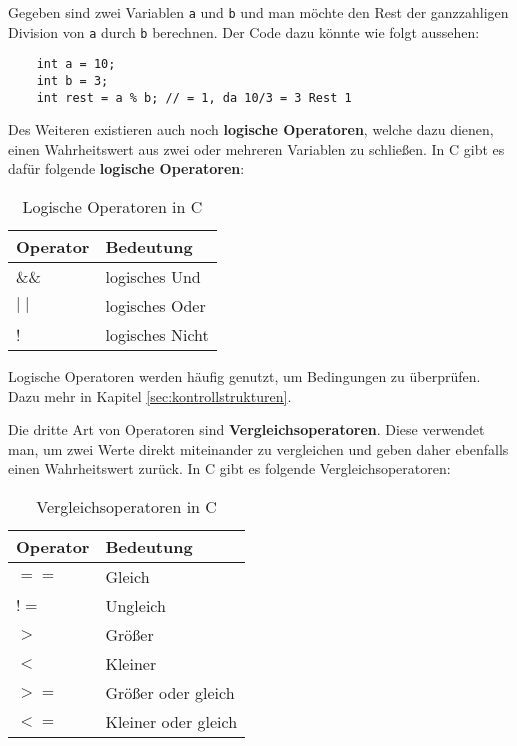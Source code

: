 \documentclass[11pt]{article}
\begin{document}
\begin{bsp}
  Gegeben sind zwei Variablen \texttt{a} und \texttt{b} und man möchte den Rest der ganzzahligen Division von \texttt{a}
  durch \texttt{b} berechnen. Der Code dazu könnte wie folgt aussehen:
  \begin{verbatim}
    int a = 10;
    int b = 3;
    int rest = a % b; // = 1, da 10/3 = 3 Rest 1
  \end{verbatim}

\end{bsp}

Des Weiteren existieren auch noch \textbf{logische Operatoren}, welche dazu dienen, einen Wahrheitswert aus zwei oder
mehreren Variablen zu schließen. In C gibt es dafür folgende \textbf{logische Operatoren}:
\begin{table}[h!]
  \centering
  \begin{tabular}{@{}ll@{}}
    \toprule
    Operator   & Bedeutung       \\ \midrule
    \&\&       & logisches Und   \\
    $\mid\mid$ & logisches Oder  \\
    !          & logisches Nicht \\ \bottomrule
  \end{tabular}
  \caption{Logische Operatoren in C}
\end{table}

Logische Operatoren werden häufig genutzt, um Bedingungen zu überprüfen. Dazu mehr in Kapitel \ref{sec:kontrollstrukturen}.

Die dritte Art von Operatoren sind \textbf{Vergleichsoperatoren}. Diese verwendet man, um zwei Werte direkt miteinander
zu vergleichen und geben daher ebenfalls einen Wahrheitswert zurück. In C gibt es folgende Vergleichsoperatoren:
\begin{table}[h!]
  \centering
  \begin{tabular}{@{}ll@{}}
    \toprule
    Operator & Bedeutung           \\ \midrule
    $==$     & Gleich              \\
    $!=$     & Ungleich            \\
    $>$      & Größer              \\
    $<$      & Kleiner             \\
    $>=$     & Größer oder gleich  \\
    $<=$     & Kleiner oder gleich \\ \bottomrule
  \end{tabular}
  \caption{Vergleichsoperatoren in C}
\end{table}
\end{document}
